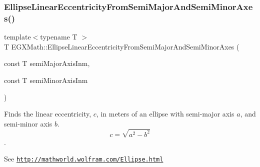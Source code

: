 \mbox{\label{group___e_g_x_math-_geometry-2_d-_ellipse-_linear_eccentricity_gaa5eb80a161cf3597ea6971f4a1d2f8e8}} 
\subsubsection{\texorpdfstring{Ellipse\+Linear\+Eccentricity\+From\+Semi\+Major\+And\+Semi\+Minor\+Axes()}{EllipseLinearEccentricityFromSemiMajorAndSemiMinorAxes()}}
{\footnotesize\ttfamily template$<$typename T $>$ \\
T E\+G\+X\+Math\+::\+Ellipse\+Linear\+Eccentricity\+From\+Semi\+Major\+And\+Semi\+Minor\+Axes (\begin{DoxyParamCaption}\item[{const T}]{semi\+Major\+Axis\+Inm,  }\item[{const T}]{semi\+Minor\+Axis\+Inm }\end{DoxyParamCaption})}



Finds the linear eccentricity, $c$, in meters of an ellipse with semi-\/major axis $a$, and semi-\/minor axis $b$. \[ c=\sqrt{a^2-b^2} \]. 

See \href{http://mathworld.wolfram.com/Ellipse.html}{\tt http\+://mathworld.\+wolfram.\+com/\+Ellipse.\+html}


